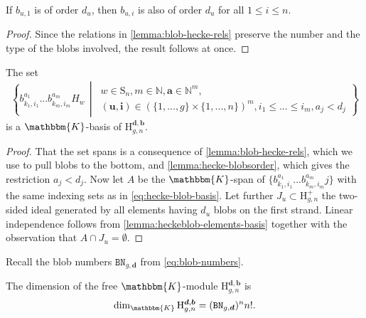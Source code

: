 \documentclass[a4paper,11pt]{amsart}
\renewcommand{\dots}{\text{...}}
\newcommand{\setstuff}[1]{\mathrm{#1}}
\newcommand{\KK}{\mathbbm{K}}
\newcommand{\N}{\mathbb{N}}
\newcommand{\bsym}[1]{\boldsymbol{#1}}
\newcommand{\varsym}[1]{\mathtt{#1}}
\newcommand{\bpar}{\bsym{b}}
\newcommand{\dpar}{\bsym{d}}
\newcommand{\bbvar}{\varsym{BN}}
\numberwithin{equation}{section}
\let\fullref\autoref
\begin{document}
\begin{lemma}\label{lemma:hecke-blobsorder}
If $b_{u,1}$ is of 
order $d_{u}$, then $b_{u,i}$ is also of 
order $d_{u}$ for all $1\leq i\leq n$.
\end{lemma}

\begin{proof}
Since the relations in \fullref{lemma:blob-hecke-rels} 
preserve the number and the type of the blobs involved,
the result follows at once.
\end{proof}

\begin{proposition}\label{proposition:heckeblobcyclo-elements-basis}
The set 
\begin{gather}\label{eq:hecke-blob-basis}
\left\{ 
b_{k_{1},i_{1}}^{a_{1}}\dots 
b_{k_{m},i_{m}}^{a_{m}}H_{w} 
\,\middle\vert\,
\begin{gathered}
w\in\setstuff{S}_{n},
m\in\N,
\bsym{a}\in\N^{m},
\\
(\bsym{u},\bsym{i})\in(\{1,\dots,g\}\times\{1,\dots,n\})^{m},
i_{1}\leq\dots\leq i_{m},a_{j}<d_{j}
\end{gathered}
\right\} 
\end{gather}
is a $\KK$-basis of $\setstuff{H}_{g,n}^{\dpar,\bpar}$.
\end{proposition}

\begin{proof}
That the set spans is a consequence 
of \fullref{lemma:blob-hecke-rels}, which we use to pull 
blobs to the bottom,
and \fullref{lemma:hecke-blobsorder}, which gives 
the restriction $a_{j}<d_{j}$.
Now let $A$ be the $\KK$-span of $\{b_{k_{1},i_{1}}^{a_{1}}\dots  b_{k_{m},i_{m}}^{a_{m}}j\}$ with the same indexing sets as in 
\eqref{eq:hecke-blob-basis}. Let further 
$J_{u}\subset\setstuff{H}_{g,n}^{+}$ 
the two-sided ideal 
generated by  all elements having $d_{u}$ blobs 
on the first strand. 
Linear independence follows from 
\fullref{lemma:heckeblob-elements-basis} 
together with the observation that $A\cap J_{u}=\emptyset$. 
\end{proof}

Recall the blob numbers $\bbvar_{g,\dpar}$ from \eqref{eq:blob-numbers}.

\begin{proposition}
The dimension of the 
free $\KK$-module $\setstuff{H}_{g,n}^{\dpar,\bpar}$ is
\begin{gather*}
\dim_{\KK}\setstuff{H}_{g,n}^{\dpar,\bpar}
=(\bbvar_{g,\dpar})^{n}n!. 
\end{gather*}
\end{proposition}
\end{document}
